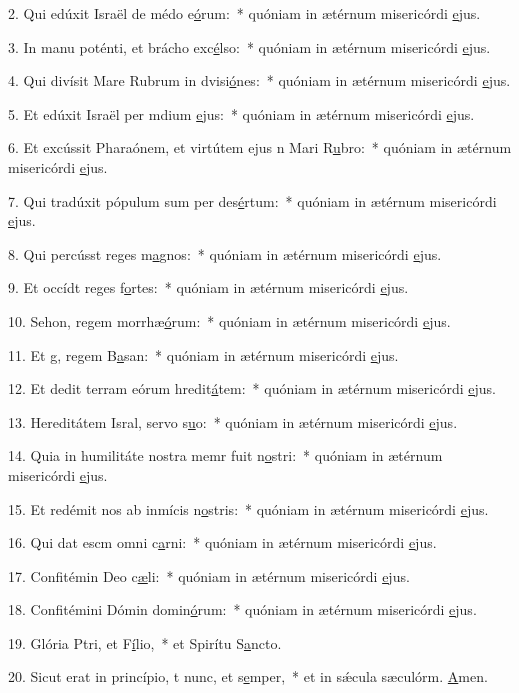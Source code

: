 2. Qui edúxit Israël de médo e\uline{ó}rum:~* quóniam in ætérnum misericórdi \uline{e}jus.\par 
3. In manu poténti, et brácho exc\uline{é}lso:~* quóniam in ætérnum misericórdi \uline{e}jus.\par 
4. Qui divísit Mare Rubrum in dvisi\uline{ó}nes:~* quóniam in ætérnum misericórdi \uline{e}jus.\par 
5. Et edúxit Israël per mdium \uline{e}jus:~* quóniam in ætérnum misericórdi \uline{e}jus.\par 
6. Et excússit Pharaónem, et virtútem ejus n Mari R\uline{u}bro:~* quóniam in ætérnum misericórdi \uline{e}jus.\par 
7. Qui tradúxit pópulum sum per des\uline{é}rtum:~* quóniam in ætérnum misericórdi \uline{e}jus.\par 
8. Qui percússt reges m\uline{a}gnos:~* quóniam in ætérnum misericórdi \uline{e}jus.\par 
9. Et occídt reges f\uline{o}rtes:~* quóniam in ætérnum misericórdi \uline{e}jus.\par 
10. Sehon, regem morrhæ\uline{ó}rum:~* quóniam in ætérnum misericórdi \uline{e}jus.\par 
11. Et g, regem B\uline{a}san:~* quóniam in ætérnum misericórdi \uline{e}jus.\par 
12. Et dedit terram eórum hredit\uline{á}tem:~* quóniam in ætérnum misericórdi \uline{e}jus.\par 
13. Hereditátem Isral, servo s\uline{u}o:~* quóniam in ætérnum misericórdi \uline{e}jus.\par 
14. Quia in humilitáte nostra memr fuit n\uline{o}stri:~* quóniam in ætérnum misericórdi \uline{e}jus.\par 
15. Et redémit nos ab inmícis n\uline{o}stris:~* quóniam in ætérnum misericórdi \uline{e}jus.\par 
16. Qui dat escm omni c\uline{a}rni:~* quóniam in ætérnum misericórdi \uline{e}jus.\par 
17. Confitémin Deo c\uline{æ}li:~* quóniam in ætérnum misericórdi \uline{e}jus.\par 
18. Confitémini Dómin domin\uline{ó}rum:~* quóniam in ætérnum misericórdi \uline{e}jus.\par 
19. Glória Ptri, et F\uline{í}lio,~* et Spirítu S\uline{a}ncto.\par 
20. Sicut erat in princípio, t nunc, et s\uline{e}mper,~* et in sǽcula sæculórm. \uline{A}men.\par 

